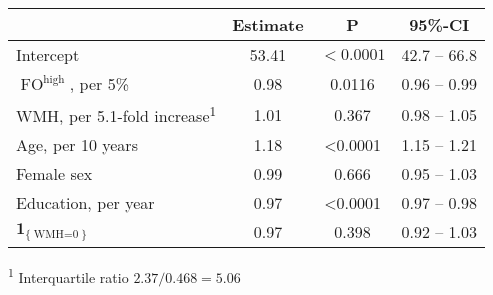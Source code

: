 \begin{table}
\setlength{\LTpost}{0mm}
\begin{longtable}{lccc}
\toprule
 & Estimate & P & 95\%-CI \\ 
\midrule
Intercept & 53.41 & $<0.0001$ & 42.7 -- 66.8 \\ 
$\operatorname{FO}^{\text{high}}$, per 5\% & 0.98 & 0.0116 & 0.96 -- 0.99 \\ 
WMH, per 5.1-fold increase\textsuperscript{1} & 1.01 & 0.367 & 0.98 -- 1.05 \\ 
Age, per 10 years & 1.18 & <0.0001 & 1.15 -- 1.21 \\ 
Female sex & 0.99 & 0.666 & 0.95 -- 1.03 \\ 
Education, per year & 0.97 & <0.0001 & 0.97 -- 0.98 \\ 
$\mathbf{1}_{\{\operatorname{WMH=0}\}}$ & 0.97 & 0.398 & 0.92 -- 1.03 \\
\bottomrule
\end{longtable}
\textsuperscript{1} Interquartile ratio $2.37/0.468=5.06$
\label{tab:hyp2}
\end{table}